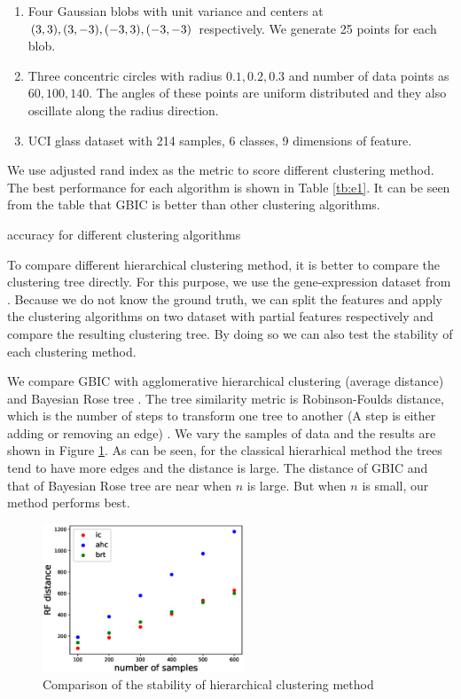 \begin{enumerate}
\item Four Gaussian blobs with unit variance and centers at $(3,3), (3,-3), (-3,3),  \linebreak[4](-3,-3)$ respectively.  We generate 25 points for each blob.
\item Three concentric circles with radius $0.1,0.2,0.3$ and number of data points as $60, 100, 140$. The angles of these points are uniform distributed and they also oscillate along the radius direction.
\item UCI glass dataset with 214 samples, 6 classes, 9 dimensions of feature.
\end{enumerate}
We use adjusted rand index as the metric to score different clustering method.
The best performance for each algorithm is shown in Table \ref{tb:e1}.
It can be seen from the table that GBIC is better than other clustering algorithms.
\begin{table}[!ht]
\centering
{}
\caption{ accuracy for different clustering algorithms }\label{tb:e1}
\end{table}

To compare different hierarchical clustering method, it is better to compare the clustering tree directly.
For this purpose,
we use the gene-expression dataset from \cite{khan2001classification}.
Because we do not know the ground truth, we can split the features and apply the clustering algorithms on two dataset with partial features respectively and compare the resulting clustering tree. By doing so we can also test the stability of each clustering method.

We compare GBIC with agglomerative hierarchical clustering (average distance) and Bayesian Rose tree \citep{blundell2011discovering}. The tree similarity metric is Robinson-Foulds distance, which is the number of steps to transform one tree to another (A step is either adding or removing an edge) \citep{day1985optimal}. We vary the samples of data and the results are shown in Figure \ref{fig:shc}. As can be seen, for the classical hierarhical method the trees tend to have more edges and the distance is large. The distance of GBIC and that of Bayesian Rose tree are near when $n$ is large. But when $n$ is small, our method performs best.

\begin{figure}
\centering
\includegraphics[width=6cm]{pic/plot_results.eps}
\caption{Comparison of the stability of hierarchical clustering method}\label{fig:shc}
\end{figure}

